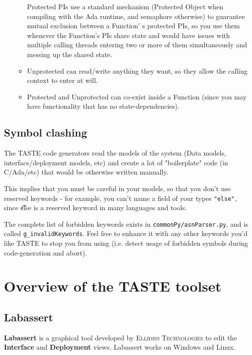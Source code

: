 \documentclass[11pt]{book}
\newcommand{\Concept}[1]{#1\xspace}
\newcommand{\taste}{\Concept{TASTE}}
\begin{document}
\begin{enumerate}
\begin{itemize}
                  Protected PIs use a standard mechanism (Protected Object when compiling with the Ada runtime,
                  and semaphore otherwise) to 
                  guarantee mutual exclusion between a Function'
                  s protected PIs, so you use them whenever the 
                  Function's PIs share state and would have issues 
                  with multiple calling threads entering two or more 
                  of them simultaneously and messing up the shared state.
               \item
                  Unprotected can read/write anything they want, so they 
                  allow the calling context to enter at will. 
               \item
                  Protected and Unprotected can co-exist inside a Function 
                  (since you may have functionality that has no state-dependencies). 
            \end{itemize}

         \end{enumerate}

   \section{Symbol clashing}
	The TASTE code generators read the models of the system (Data models, 
	interface/deployment models, etc) and create a lot of "boilerplate" code
	(in C/Ada/etc) that would be otherwise written manually. 

	This implies that you must be careful in your models, so that you don't use reserved
	keywords - for example, you can't name a field of your types {\tt "else"},
	since {\t else} is a reserved keyword in many languages and tools.

	The complete list of forbidden keywords exists in {\tt commonPy/asnParser.py},
	and is called {\tt g\_invalidKeywords}. Feel free to enhance it with 
	any other keywords you'd like TASTE to stop you from using (i.e. detect
	usage of forbidden symbols during code-generation and abort).

\chapter{Overview of the \taste toolset}
   \section{Labassert}
   \textbf{Labassert} is a graphical tool developed by \textsc{Ellidiss Technologies} to
   edit the \textbf{Interface} and \textbf{Deployment} views. Labassert works on
   Windows and Linux.
\end{document}
